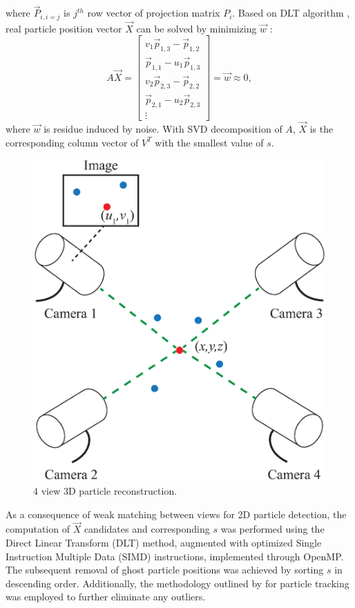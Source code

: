 \documentclass[draftthesis,fullpage]{uiucthesis}
\begin{document}
where $\overrightarrow{P}_{i,i=j}$ is $j^{th}$ row vector of projection matrix \textbf{$P_i$}. Based on DLT algorithm \citep{shapiro1978direct}, real particle position vector $\overrightarrow{X}$ can be solved by minimizing $\vec{w}$ :
\begin{equation}
       A \vec{X}=\left[\begin{array}{c}
       v_1 \vec{p}_{1,3}-\vec{p}_{1,2} \\
       \vec{p}_{1,1}-u_1 \vec{p}_{1,3} \\
       v_2 \vec{p}_{2,3}-\vec{p}_{2,2} \\
       \vec{p}_{2,1}-u_2 \vec{p}_{2,3} \\
       \vdots
       \end{array}\right] = \vec{w} \approx 0,
\end{equation}
where $\vec{w}$ is residue induced by noise. With SVD decomposition of $A$,  $\overrightarrow{X}$ is the corresponding column vector of $V^T$ with the smallest value of $s$. 
\begin{figure}[h]
       \centerline{\includegraphics[width=0.6\linewidth]{fig/DLT.eps}}
       \caption{4 view 3D particle reconstruction.}
       \label{fig:DLT}
\end{figure}
As a consequence of weak matching between views for 2D particle detection, the computation of $\overrightarrow{X}$ candidates and corresponding $s$ was performed using the Direct Linear Transform (DLT) method, augmented with optimized Single Instruction Multiple Data (SIMD) instructions, implemented through OpenMP. The subsequent removal of ghost particle positions was achieved by sorting $s$ in descending order. Additionally, the methodology outlined by \cite{crocker1996methods} for particle tracking was employed to further eliminate any outliers.
\end{document}
